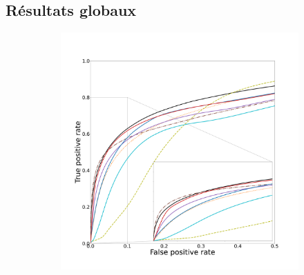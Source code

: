\subsection{Résultats globaux}


\begin{figure}[!ht]
  \begin{subfigure}[t]{0.78\textwidth}
    \includegraphics[width=\textwidth,clip = true, trim  =  125 125 180 260]{Images/Ircad_ROC.pdf}  
  \end{subfigure}
  \begin{subfigure}[t]{0.2\textwidth}

\end{subfigure}
\end{figure}
